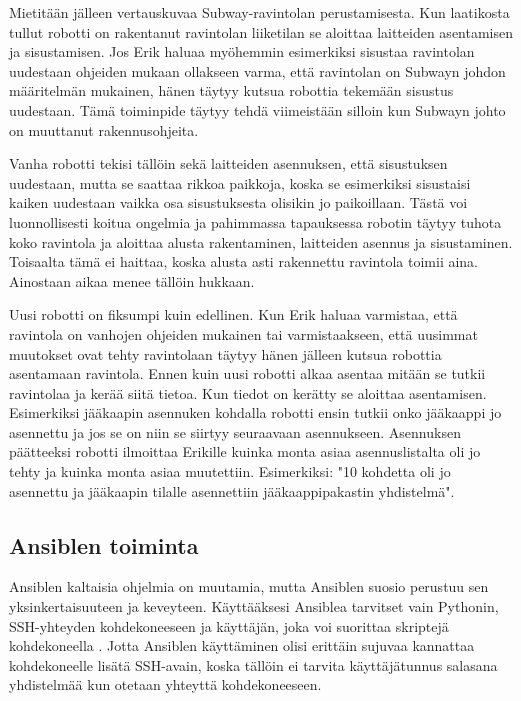 Mietitään jälleen vertauskuvaa Subway-ravintolan perustamisesta. Kun laatikosta tullut robotti on rakentanut ravintolan liiketilan se aloittaa laitteiden asentamisen ja sisustamisen. Jos Erik haluaa myöhemmin esimerkiksi sisustaa ravintolan uudestaan ohjeiden mukaan ollakseen varma, että ravintolan on Subwayn johdon määritelmän mukainen, hänen täytyy kutsua robottia tekemään sisustus uudestaan. Tämä toiminpide täytyy tehdä viimeistään silloin kun Subwayn johto on muuttanut rakennusohjeita.

Vanha robotti tekisi tällöin sekä laitteiden asennuksen, että sisustuksen uudestaan, mutta se saattaa rikkoa paikkoja, koska se esimerkiksi sisustaisi kaiken uudestaan vaikka osa sisustuksesta olisikin jo paikoillaan. Tästä voi luonnollisesti koitua ongelmia ja pahimmassa tapauksessa robotin täytyy tuhota koko ravintola ja aloittaa alusta rakentaminen, laitteiden asennus ja sisustaminen. Toisaalta tämä ei haittaa, koska alusta asti rakennettu ravintola toimii aina. Ainostaan aikaa menee tällöin hukkaan.

Uusi robotti on fiksumpi kuin edellinen. Kun Erik haluaa varmistaa, että ravintola on vanhojen ohjeiden mukainen tai varmistaakseen, että uusimmat muutokset ovat tehty ravintolaan täytyy hänen jälleen kutsua robottia asentamaan ravintola. Ennen kuin uusi robotti alkaa asentaa mitään se tutkii ravintolaa ja kerää siitä tietoa. Kun tiedot on kerätty se aloittaa asentamisen. Esimerkiksi jääkaapin asennuken kohdalla robotti ensin tutkii onko jääkaappi jo asennettu ja jos se on niin se siirtyy seuraavaan asennukseen. Asennuksen päätteeksi robotti ilmoittaa Erikille kuinka monta asiaa asennuslistalta oli jo tehty ja kuinka monta asiaa muutettiin. Esimerkiksi: "10 kohdetta oli jo asennettu ja jääkaapin tilalle asennettiin jääkaappipakastin yhdistelmä".

\subsection{Ansiblen toiminta}

Ansiblen kaltaisia ohjelmia on muutamia, mutta Ansiblen suosio perustuu sen yksinkertaisuuteen ja keveyteen. Käyttääksesi Ansiblea tarvitset vain Pythonin, SSH-yhteyden kohdekoneeseen ja käyttäjän, joka voi suorittaa skriptejä kohdekoneella \cite{link:what-is-ansible}. Jotta Ansiblen käyttäminen olisi erittäin sujuvaa kannattaa kohdekoneelle lisätä SSH-avain, koska tällöin ei tarvita käyttäjätunnus salasana yhdistelmää kun otetaan yhteyttä kohdekoneeseen.

